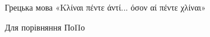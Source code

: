 \documentclass{kapital}
\begin{document}
    Грецька мова «\textgreek{Κλίναι πέντε άντί... όσον αί πέντε χλίναι}»

    Для порівняння По\textgreek{Πο}
\end{document}
